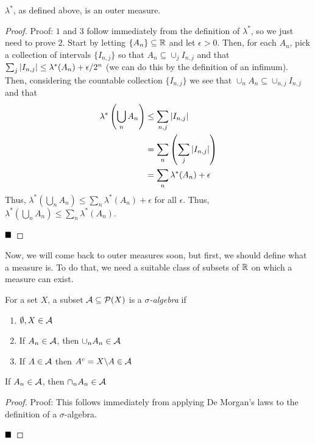 \begin{lemma}
    $\lambda^{*}$, as defined above, is an outer measure.
\end{lemma}
\begin{proof}{Proof:}
    $1$ and $3$ follow immediately from the definition of $\lambda^{*}$, so we just need to prove $2$. Start by letting $\{A_n\} \subseteq \R$ and let $\epsilon > 0$. Then, for each $A_{n}$, pick a collection of intervals $\{I_{n, j}\}$ so that $A_n \subseteq \cup_{j} I_{n, j}$ and that $\sum_{j} \abs{I_{n, j}} \leq \lambda^{*}(A_n) + \epsilon/2^{n}$ (we can do this by the definition of an infimum). Then, considering the countable collection $\{I_{n, j}\}$ we see that $\cup_{n} A_n \subseteq \cup_{n, j} I_{n, j}$ and that
    \begin{align*}
        \lambda^{*}\left(\bigcup_{n} A_n\right) &\leq \sum_{n, j} \abs{I_{n, j}}\\
        &= \sum_{n}\left(\sum_{j} \abs{I_{n, j}}\right)\\
        &= \sum_{n} \lambda^{*}(A_n) + \epsilon
    \end{align*}
    Thus, $\lambda^{*}\left(\bigcup_{n} A_n\right) \leq \sum_{n} \lambda^{*}(A_n) + \epsilon$ for all $\epsilon$. Thus, $\lambda^{*}\left(\bigcup_{n} A_n\right) \leq \sum_{n} \lambda^{*}(A_n)$.

    $\qed$
\end{proof}

Now, we will come back to outer measures soon, but first, we should define what a measure is. To do that, we need a suitable class of subsets of $\R$ on which a measure can exist.

\begin{definition}
    For a set $X$, a subset $\cal{A} \subseteq \P(X)$ is a \emph{$\sigma$-algebra} if
    \begin{enumerate}
        \item $\emptyset, X \in \cal{A}$
        \item If $A_n \in \cal{A}$, then $\cup_{n} A_n \in \cal{A}$
        \item If $A \in \cal{A}$ then $A^{c} = X \backslash A \in \cal{A}$
    \end{enumerate}
\end{definition}

\begin{lemma}
    If $A_n \in \cal{A}$, then $\cap_{n} A_n \in \cal{A}$
\end{lemma}
\begin{proof}{Proof:}
    This follows immediately from applying De Morgan's laws to the definition of a $\sigma$-algebra.

    $\qed$
\end{proof}

